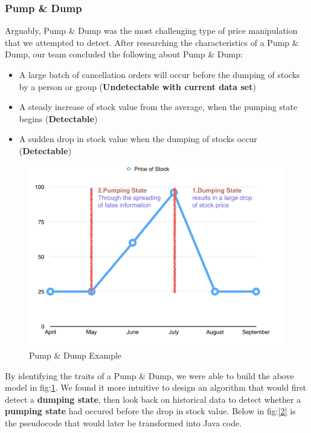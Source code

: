 \documentclass[12pt]{article}
\begin{document}
    \subsubsection{Pump \& Dump}
    Arguably, Pump \& Dump was the most challenging type of price manipulation that we attempted to detect.
    After researching the characteristics of a Pump \& Dump, our team concluded the following about Pump \& Dump:
    \begin{itemize}
      \item A large batch of cancellation orders will occur before the dumping of stocks by a person or group (\textbf{Undetectable with current data set})
      \item A steady increase of stock value from the average, when the pumping state begins (\textbf{Detectable})
      \item A sudden drop in stock value when the dumping of stocks occur (\textbf{Detectable})
    \end{itemize}
    \begin{figure}[H]
    \centering
    \includegraphics[width=150mm]{PumpDumpGraph.png}
    \caption{Pump \& Dump Example}
    \label{1}
    \end{figure}
    By identifying the traits of a Pump \& Dump, we were able to build the above model in fig:\ref{1}.
    We found it more intuitive to design an algorithm that would first detect a \textbf{dumping state}, then look back
    on historical data to detect whether a \textbf{pumping state} had occured before the drop in stock value. Below in fig:\ref{2} is the
    pseudocode that would later be transformed into Java code.
\end{document}
